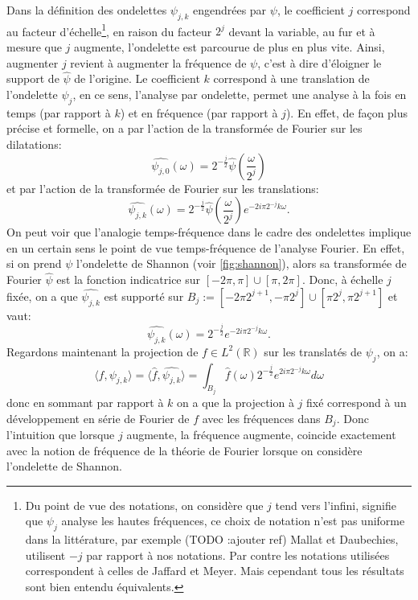 \begin{remarque}
	Dans la définition des ondelettes $\psi_{j,k}$ engendrées par $\psi$, le coefficient $j$ correspond au facteur d'échelle\footnote{Du point de vue des notations, on considère que $j$ tend vers l'infini, signifie que $\psi_j$ analyse les hautes fréquences, ce choix de notation n'est pas uniforme dans la littérature, par exemple (TODO :ajouter ref) Mallat et Daubechies, utilisent $-j$ par rapport à nos notations. Par contre les notations utilisées correspondent à celles de Jaffard et Meyer. Mais cependant tous les résultats sont bien entendu équivalents.},
	en raison du facteur $2^j$ devant la variable, au fur et à mesure que $j$ augmente, l'ondelette est parcourue de plus en plus vite. Ainsi, augmenter $j$ revient à augmenter la fréquence de $\psi$, c'est à dire d'éloigner le support de $\hat{\psi}$ de l'origine. 
	Le coefficient $k$ correspond à une translation de l'ondelette $\psi_j$, en ce sens, l'analyse par ondelette, permet une analyse à la fois en temps (par rapport à $k$) et en fréquence (par rapport à $j$).
	\newline 
	En effet, de façon plus précise et formelle, on a par l'action de la transformée de Fourier sur les dilatations: 
	\begin{equation}
		\widehat{\psi_{j,0}}(\omega) = 2^{-\frac{j}{2}}\hat{\psi}(\frac{\omega}{2^j})
	\end{equation}
	et par l'action de la transformée de Fourier sur les translations:
	\begin{equation}
		\widehat{\psi_{j,k}}(\omega) = 2^{-\frac{j}{2}}\hat{\psi}(\frac{\omega}{2^j})e^{-2i\pi 2^{-j}k\omega}.
	\end{equation}
	On peut voir que l'analogie temps-fréquence dans le cadre des ondelettes implique en un certain sens le point de vue temps-fréquence de l'analyse Fourier.
	En effet, si on prend $\psi$ l'ondelette de Shannon (voir \ref{fig:shannon}), alors sa transformée de Fourier $\hat{\psi}$ est la fonction indicatrice sur $[-2\pi, \pi]\cup[\pi, 2\pi]$.
	Donc, à échelle $j$ fixée, on a que $\widehat{\psi_{j,k}}$ est supporté sur $B_j := [-2\pi2^{j+1}, -\pi2^j]\cup[\pi2^j, \pi2^{j+1}]$ et vaut:
	\begin{equation}
		\widehat{\psi_{j,k}}(\omega) = 2^{-\frac{j}{2}}e^{-2i\pi 2^{-j}k\omega}.
	\end{equation}
	Regardons maintenant la projection de $f\in L^2(\mathbb{R})$ sur les translatés de $\psi_j$, on a:
	\begin{equation}
		\langle f, \psi_{j,k} \rangle = \langle \hat{f}, \widehat{\psi_{j,k}} \rangle = \int_{B_j} \hat{f}(\omega) 2^{-\frac{j}{2}} e^{2i\pi2^{-j}k\omega} d\omega
	\end{equation}	
	donc en sommant par rapport à $k$ on a que la projection à $j$ fixé correspond à un développement en série de Fourier de $f$ avec les fréquences dans $B_j$.
	Donc l'intuition que lorsque $j$ augmente, la fréquence augmente, coincide exactement avec la notion de fréquence de la théorie de Fourier lorsque on considère l'ondelette de Shannon.

\end{remarque}
